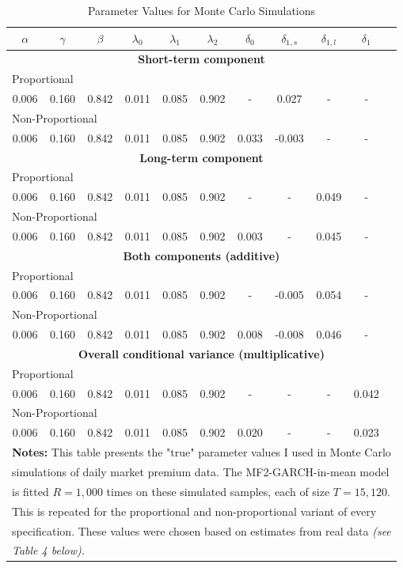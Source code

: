 \documentclass{article}
\begin{document}
\begin{table}
\centering
\caption{Parameter Values for Monte Carlo Simulations}
\begin{tabular}{ccccccccccc}
\midrule
\midrule
$\alpha$ & $\gamma$ & $\beta$ & $\lambda_0$ & $\lambda_1$ & $\lambda_2$ & $\delta_0$ & $\delta_{1,s}$ & $\delta_{1,l}$ & $\delta_{1}$\\
\midrule
\multicolumn{11}{c}{\textbf{Short-term component}}\\
\multicolumn{11}{l}{Proportional}\\
0.006 & 0.160 & 0.842 & 0.011 & 0.085 & 0.902 & - & 0.027 & - & -\\
\multicolumn{11}{l}{Non-Proportional}\\
0.006 & 0.160 & 0.842 & 0.011 & 0.085 & 0.902 & 0.033 & -0.003 & - & -\\
\midrule
\multicolumn{11}{c}{\textbf{Long-term component}}\\
\multicolumn{11}{l}{Proportional}\\
0.006 & 0.160 & 0.842 & 0.011 & 0.085 & 0.902 & - & - & 0.049  & -\\
\multicolumn{11}{l}{Non-Proportional}\\
0.006 & 0.160 & 0.842 & 0.011 & 0.085 & 0.902 & 0.003 & - & 0.045 & -\\
\midrule
\multicolumn{11}{c}{\textbf{Both components (additive)}}\\
\multicolumn{11}{l}{Proportional}\\
0.006 & 0.160 & 0.842 & 0.011 & 0.085 & 0.902 & - & -0.005 & 0.054 & -\\
\multicolumn{11}{l}{Non-Proportional}\\
0.006 & 0.160 & 0.842 & 0.011 & 0.085 & 0.902 & 0.008 & -0.008 & 0.046 & -\\
\midrule
\multicolumn{11}{c}{\textbf{Overall conditional variance (multiplicative)}}\\
\multicolumn{11}{l}{Proportional}\\
0.006 & 0.160 & 0.842 & 0.011 & 0.085 & 0.902 & - & - & - & 0.042\\
\multicolumn{11}{l}{Non-Proportional}\\
0.006 & 0.160 & 0.842 & 0.011 & 0.085 & 0.902 & 0.020 & - & - & 0.023\\
\midrule
\multicolumn{11}{l}{\textbf{Notes:} This table presents the "true" parameter values I used in Monte Carlo}\\
\multicolumn{11}{l}{simulations of daily market premium data. The MF2-GARCH-in-mean model}\\
\multicolumn{11}{l}{is fitted $R=1,000$ times on these simulated samples, each of size $T=15,120$.}\\
\multicolumn{11}{l}{This is repeated for the proportional and non-proportional variant of every}\\
\multicolumn{11}{l}{specification. These values were chosen based on estimates from real data \textit{(see}}\\
\multicolumn{11}{l}{\textit{Table 4 below).}}\\
\midrule
\midrule
\end{tabular}
\end{table}
\end{document}
